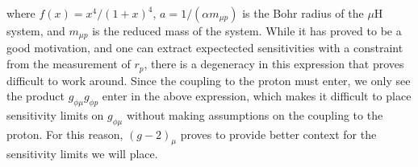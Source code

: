 \noindent where $f(x) = x^4/(1+x)^4$, $a = 1/(\alpha m_{\mu p})$ is the Bohr radius of the $\mu\textrm{H}$ system, and $m_{\mu p}$ is the reduced mass of the system.
While it has proved to be a good motivation, and one can extract expectected sensitivities with a constraint from the measurement of $r_p$, there is a degeneracy in this expression that proves difficult to work around.
Since the coupling to the proton must enter, we only see the product $g_{\phi\mu} g_{\phi p}$ enter in the above expression, which makes it difficult to place sensitivity limits on $g_{\phi\mu}$ without making assumptions on the coupling to the proton.
For this reason, $(g-2)_\mu$ proves to provide better context for the sensitivity limits we will place.
